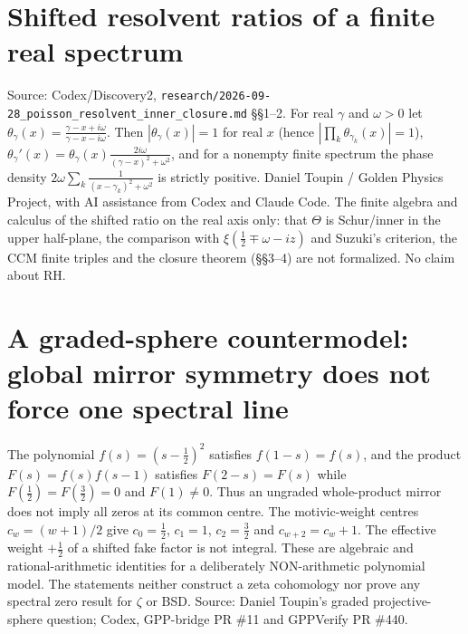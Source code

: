 \documentclass{report}
\theoremstyle{definition}
\begin{document}
\begin{itemize}
\begin{itemize}
\section{Shifted resolvent ratios of a finite real spectrum}
Source: Codex/Discovery2, \texttt{research/2026-09-28\_poisson\_resolvent\_inner\_closure.md} \S\S1--2. For real $\gamma$ and $\omega>0$ let $\theta_\gamma(x)=\frac{\gamma-x+i\omega}{\gamma-x-i\omega}$. Then $|\theta_\gamma(x)|=1$ for real $x$ (hence $|\prod_k\theta_{\gamma_k}(x)|=1$), $\theta_\gamma'(x)=\theta_\gamma(x)\frac{2i\omega}{(\gamma-x)^2+\omega^2}$, and for a nonempty finite spectrum the phase density $2\omega\sum_k\frac1{(x-\gamma_k)^2+\omega^2}$ is strictly positive.
Daniel Toupin / Golden Physics Project, with AI assistance from Codex and Claude Code. The finite algebra and calculus of the shifted ratio on the real axis only: that $\Theta$ is Schur/inner in the upper half-plane, the comparison with $\xi(\frac12\mp\omega-iz)$ and Suzuki's criterion, the CCM finite triples and the closure theorem (\S\S3--4) are not formalized. No claim about RH.

\section{A graded-sphere countermodel: global mirror symmetry does not force one spectral line}
The polynomial $f(s)=(s-\frac12)^2$ satisfies $f(1-s)=f(s)$, and the product $F(s)=f(s)f(s-1)$ satisfies $F(2-s)=F(s)$ while $F(\frac12)=F(\frac32)=0$ and $F(1)\ne0$. Thus an ungraded whole-product mirror does not imply all zeros at its common centre. The motivic-weight centres $c_w=(w+1)/2$ give $c_0=\frac12$, $c_1=1$, $c_2=\frac32$ and $c_{w+2}=c_w+1$. The effective weight $+\frac12$ of a shifted fake factor is not integral. These are algebraic and rational-arithmetic identities for a deliberately NON-arithmetic polynomial model. The statements neither construct a zeta cohomology nor prove any spectral zero result for $\zeta$ or BSD. Source: Daniel Toupin's graded projective-sphere question; Codex, GPP-bridge PR \#11 and GPPVerify PR \#440.

\end{itemize}
\end{itemize}
\end{document}
